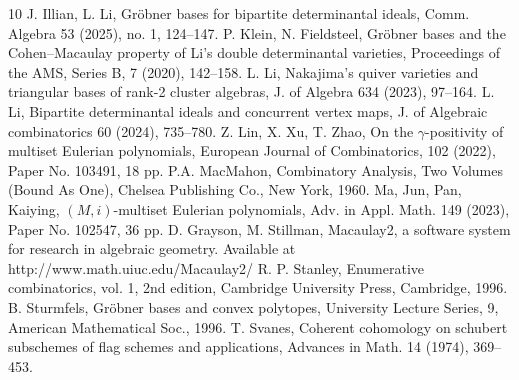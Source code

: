 \documentclass[12pt]{amsart}
\numberwithin{equation}{section}
\theoremstyle{definition}
\begin{document}
\begin{thebibliography}{10}
 J. Illian, L. Li, Gröbner bases for bipartite determinantal ideals,
Comm. Algebra 53 (2025), no. 1, 124–147.
 P. Klein, N. Fieldsteel, Gr\"obner bases and the Cohen–Macaulay property of Li's double determinantal varieties, Proceedings of the AMS, Series B, 7 (2020), 142–158. 
 L. Li, Nakajima’s quiver varieties and triangular bases of rank-2 cluster algebras, J. of Algebra 634 (2023), 97–164.
 L. Li, Bipartite determinantal ideals and concurrent vertex maps, J. of Algebraic combinatorics 60 (2024), 735–780.
 Z. Lin, X. Xu, T. Zhao, On the $\gamma$-positivity of multiset Eulerian polynomials, European Journal of Combinatorics, 102 (2022), Paper No. 103491, 18 pp.
 P.A. MacMahon, Combinatory Analysis, Two Volumes (Bound As One), Chelsea Publishing Co., New York, 1960.
 Ma, Jun, Pan, Kaiying, $(M,i)$-multiset Eulerian polynomials, 
Adv. in Appl. Math.   149 (2023), Paper No. 102547, 36 pp.
 D. Grayson, M. Stillman, Macaulay2, a software system for research in algebraic
geometry. Available at http://www.math.uiuc.edu/Macaulay2/
 R. P. Stanley, Enumerative combinatorics, vol. 1, 2nd edition, Cambridge University Press, Cambridge, 1996.
 B. Sturmfels, Gr\"obner bases and convex polytopes, University Lecture Series, 9,  American Mathematical Soc., 1996.
 T. Svanes, Coherent cohomology on schubert subschemes of flag schemes and applications, Advances in Math.   14 (1974), 369–453.
\end{thebibliography}
\end{document}
